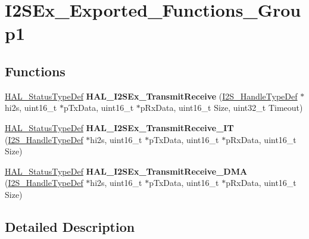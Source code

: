 \hypertarget{group___i2_s_ex___exported___functions___group1}{}\section{I2\+S\+Ex\+\_\+\+Exported\+\_\+\+Functions\+\_\+\+Group1}
\label{group___i2_s_ex___exported___functions___group1}
\subsection*{Functions}
\begin{DoxyCompactItemize}
\item 
\hyperlink{stm32f4xx__hal__def_8h_a63c0679d1cb8b8c684fbb0632743478f}{H\+A\+L\+\_\+\+Status\+Type\+Def} {\bfseries H\+A\+L\+\_\+\+I2\+S\+Ex\+\_\+\+Transmit\+Receive} (\hyperlink{struct_i2_s___handle_type_def}{I2\+S\+\_\+\+Handle\+Type\+Def} $\ast$hi2s, uint16\+\_\+t $\ast$p\+Tx\+Data, uint16\+\_\+t $\ast$p\+Rx\+Data, uint16\+\_\+t Size, uint32\+\_\+t Timeout)\hypertarget{group___i2_s_ex___exported___functions___group1_gacaac4e4831691548ade7b5f76d6b5bce}{}\label{group___i2_s_ex___exported___functions___group1_gacaac4e4831691548ade7b5f76d6b5bce}

\item 
\hyperlink{stm32f4xx__hal__def_8h_a63c0679d1cb8b8c684fbb0632743478f}{H\+A\+L\+\_\+\+Status\+Type\+Def} {\bfseries H\+A\+L\+\_\+\+I2\+S\+Ex\+\_\+\+Transmit\+Receive\+\_\+\+IT} (\hyperlink{struct_i2_s___handle_type_def}{I2\+S\+\_\+\+Handle\+Type\+Def} $\ast$hi2s, uint16\+\_\+t $\ast$p\+Tx\+Data, uint16\+\_\+t $\ast$p\+Rx\+Data, uint16\+\_\+t Size)\hypertarget{group___i2_s_ex___exported___functions___group1_gabd9cee0d3571ee3341eb5eac33cb9a63}{}\label{group___i2_s_ex___exported___functions___group1_gabd9cee0d3571ee3341eb5eac33cb9a63}

\item 
\hyperlink{stm32f4xx__hal__def_8h_a63c0679d1cb8b8c684fbb0632743478f}{H\+A\+L\+\_\+\+Status\+Type\+Def} {\bfseries H\+A\+L\+\_\+\+I2\+S\+Ex\+\_\+\+Transmit\+Receive\+\_\+\+D\+MA} (\hyperlink{struct_i2_s___handle_type_def}{I2\+S\+\_\+\+Handle\+Type\+Def} $\ast$hi2s, uint16\+\_\+t $\ast$p\+Tx\+Data, uint16\+\_\+t $\ast$p\+Rx\+Data, uint16\+\_\+t Size)\hypertarget{group___i2_s_ex___exported___functions___group1_gaed32024956333befe14df26134440ba0}{}\label{group___i2_s_ex___exported___functions___group1_gaed32024956333befe14df26134440ba0}

\end{DoxyCompactItemize}


\subsection{Detailed Description}
